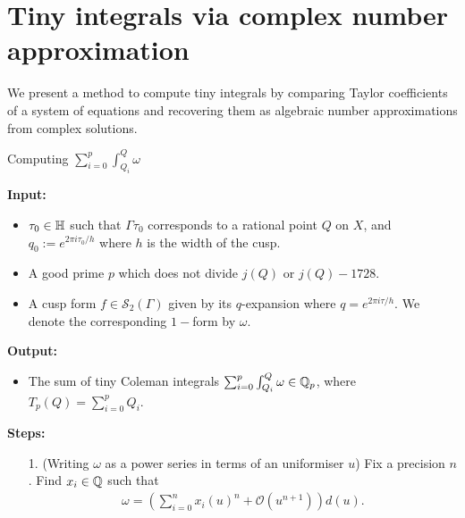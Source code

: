 \section{Tiny integrals via complex number approximation}

We present a method to compute tiny integrals by comparing Taylor coefficients of a system of equations and recovering them as algebraic number approximations from complex solutions.

\begin{algorithm}Computing $\sum_{i=0}^{p}\int^Q_{Q_i} \omega$\label{alg:tiny_integral}

\textbf{Input:}
\begin{itemize}
    \item $\tau_0 \in \mathbb{H}$ such that $\Gamma\tau_0$ corresponds to a rational point $Q$ on $X$, and $q_0 := e^{2\pi i \tau_0/h}$ where $h$ is the width of the cusp.
    \item A good prime $p$ which does not divide $j(Q)$ or $j(Q)-1728$. 
    \item A cusp form $f\in \mathcal{S}_2(\Gamma)$ given by its $q$-expansion where $q = e^{2\pi i \tau/h}$. We denote the corresponding $1-$form by $\omega$.
    



\end{itemize}

\textbf{Output:}
\begin{itemize}
    \item The sum of tiny Coleman integrals $\sum^p_{i=0}\int^Q_{Q_i} \omega \in \mathbb{Q}_p$, where $T_p(Q) = \sum_{i=0}^p Q_i$.
\end{itemize}

\textbf{Steps:}
\begin{enumerate}
\item[1.] \label{algstep:tiny_1} (Writing $\omega$ as a power series in terms of an uniformiser $u$) Fix a precision $n$. Find $x_i \in \mathbb{Q}$ such that
\begin{align} \label{eq:omega_j_exp}
    \omega = (\sum_{i=0}^n x_i(u)^n + \mathcal{O}(u^{n+1}))d(u).
\end{align}


\end{enumerate}
\end{algorithm}
